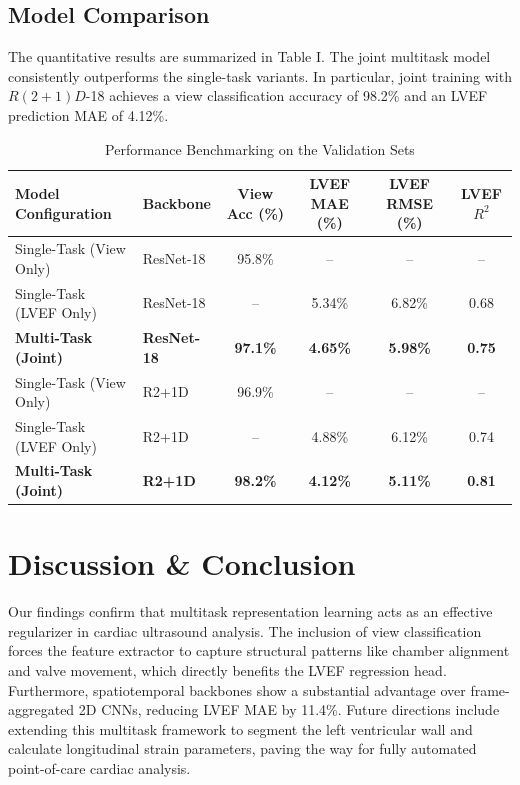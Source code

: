 \documentclass[journal]{IEEEtran}
\begin{document}
\subsection{Model Comparison}
The quantitative results are summarized in Table I. The joint multitask model consistently outperforms the single-task variants. In particular, joint training with $R(2+1)D$-18 achieves a view classification accuracy of 98.2\% and an LVEF prediction MAE of 4.12\%.

\begin{table}[htbp]
\caption{Performance Benchmarking on the Validation Sets}
\label{table_results}
\centering
\begin{tabular}{llcccc}
\toprule
\textbf{Model Configuration} & \textbf{Backbone} & \textbf{View Acc (\%)} & \textbf{LVEF MAE (\%)} & \textbf{LVEF RMSE (\%)} & \textbf{LVEF $R^2$} \\
\midrule
Single-Task (View Only) & ResNet-18 & 95.8\% & -- & -- & -- \\
Single-Task (LVEF Only) & ResNet-18 & -- & 5.34\% & 6.82\% & 0.68 \\
\textbf{Multi-Task (Joint)} & \textbf{ResNet-18} & \textbf{97.1\%} & \textbf{4.65\%} & \textbf{5.98\%} & \textbf{0.75} \\
\midrule
Single-Task (View Only) & R2+1D & 96.9\% & -- & -- & -- \\
Single-Task (LVEF Only) & R2+1D & -- & 4.88\% & 6.12\% & 0.74 \\
\textbf{Multi-Task (Joint)} & \textbf{R2+1D} & \textbf{98.2\%} & \textbf{4.12\%} & \textbf{5.11\%} & \textbf{0.81} \\
\bottomrule
\end{tabular}
\end{table}

\section{Discussion \& Conclusion}
Our findings confirm that multitask representation learning acts as an effective regularizer in cardiac ultrasound analysis. The inclusion of view classification forces the feature extractor to capture structural patterns like chamber alignment and valve movement, which directly benefits the LVEF regression head. Furthermore, spatiotemporal backbones show a substantial advantage over frame-aggregated 2D CNNs, reducing LVEF MAE by 11.4\%. Future directions include extending this multitask framework to segment the left ventricular wall and calculate longitudinal strain parameters, paving the way for fully automated point-of-care cardiac analysis.
\end{document}

